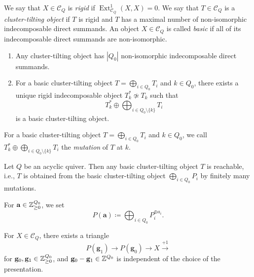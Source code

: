 \begin{Def}
\label{Def : rigid and cluster tilting objects}
We say that $X \in \mathcal{C}_Q$ is \emph{rigid} if
$\operatorname{Ext}^1_{\mathcal{C}_Q}(X, X) = 0$.
We say that $T \in \mathcal{C}_Q$ is a \emph{cluster-tilting object}
if $T$ is rigid and $T$ has a maximal number of non-isomorphic
indecomposable direct summands.
An object $X \in \mathcal{C}_Q$ is called \emph{basic}
if all of its indecomposable direct summands are non-isomorphic.
\end{Def}

\begin{Thm}
\label{Thm : cluster tilting summands and mutation}
\begin{enumerate}
    \item[(i)] Any cluster-tilting object has $|Q_0|$
    non-isomorphic indecomposable direct summands.
    \item[(ii)] For a basic cluster-tilting object
    $T = \bigoplus_{i \in Q_0}T_i$ and $k \in Q_0$,
    there exists a unique rigid indecomposable object
    $T_k^* \not\simeq T_k$ such that
    \[
    T_k^* \oplus \bigoplus_{i \in Q_0 \setminus \{k\}}T_i
    \]
    is a basic cluster-tilting object.
\end{enumerate}
\end{Thm}

For a basic cluster-tilting object
$T = \bigoplus_{i \in Q_0}T_i$ and $k \in Q_0$, we call
$T_k^* \oplus \bigoplus_{i \in Q_0 \setminus \{k\}}T_i$
the \emph{mutation} of $T$ at $k$.

\begin{Thm}
\label{Thm : additive reachability}
Let $Q$ be an acyclic quiver.
Then any basic cluster-tilting object $T$ is reachable,
i.e., $T$ is obtained from the basic cluster-tilting object
$\bigoplus_{i \in Q_0}P_i$ by finitely many mutations.
\end{Thm}

For $\mathbf{a} \in \mathbb{Z}_{\geq 0}^{Q_0}$, we set
\[
P(\mathbf{a}) \coloneq
\bigoplus_{i \in Q_0}P_i^{\oplus a_i}.
\]

\begin{Prop}
\label{Prop : presentations and index}
For $X \in \mathcal{C}_Q$, there exists a triangle
\[
P(\mathbf{g}_1) \longrightarrow P(\mathbf{g}_0)
\longrightarrow X \xrightarrow{+1}
\]
for $\mathbf{g}_0, \mathbf{g}_1 \in \mathbb{Z}_{\geq 0}^{Q_0}$,
and $\mathbf{g}_0 - \mathbf{g}_1 \in \mathbb{Z}^{Q_0}$ is independent
of the choice of the presentation.
\end{Prop}

